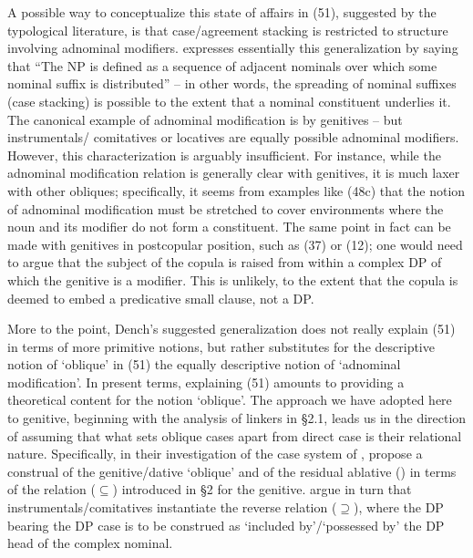 \documentclass[output=paper]{langsci/langscibook}
\begin{document}
A possible way to conceptualize this state of affairs in (51), suggested by the typological literature, is that case\slash agreement stacking is restricted to structure involving adnominal modifiers. \citet[386]{Dench1995} expresses essentially this generalization by saying that “The NP is defined as a sequence of adjacent nominals over which some nominal suffix is distributed” – in other words, the spreading of nominal suffixes (case stacking) is possible to the extent that a nominal constituent underlies it. The canonical example of adnominal modification is by genitives – but instrumentals/ comitatives or locatives are equally possible adnominal modifiers. However, this characterization is arguably insufficient. For instance, while the adnominal modification relation is generally clear with genitives, it is much laxer with other obliques; specifically, it seems from examples like (48c) that the notion of adnominal modification must be stretched to cover environments where the noun and its modifier do not form a constituent. The same point in fact can be made with genitives in postcopular position, such as  (37) or  (12); one would need to argue that the subject of the copula is raised from within a complex DP of which the genitive is a modifier. This is unlikely, to the extent that the copula is deemed to embed a predicative small clause, not a DP.

More to the point, Dench’s suggested generalization does not really explain (51) in terms of more primitive notions, but rather substitutes for the descriptive notion of ‘oblique’ in (51) the equally descriptive notion of ‘adnominal modification’. In present terms, explaining (51) amounts to providing a theoretical content for the notion ‘oblique’. The approach we have adopted here to genitive, beginning with the analysis of  linkers in §2.1, leads us in the direction of assuming that what sets oblique cases apart from direct case is their relational nature. Specifically, in their investigation of the case system of , \citet{Manzini2011Grammatical,Manzini2011Reducing} propose a construal of the genitive\slash dative  ‘oblique’ and of the residual ablative () in terms of the relation ($\subseteq$) introduced in §2 for the genitive. \citet{Franco2015} argue in turn that instrumentals\slash comitatives instantiate the reverse relation ($\supseteq$), where the DP bearing the DP case is to be construed as ‘included by’/‘possessed by’ the DP head of the complex nominal. 
\end{document}
